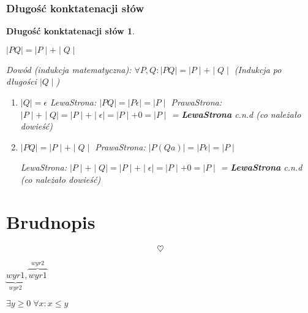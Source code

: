 \subsection{Długość konktatenacji słów}

\newtheorem*{theorem14*}{Długość konktatenacji słów}
\begin{theorem14*}
\begin{center}
$\mid PQ \mid = \mid P \mid + \mid Q \mid$
\end{center}

Dowód (indukcja matematyczna):\newline
$\forall P,Q: \mid PQ \mid = \mid P \mid + \mid Q \mid$ (Indukcja po długości $\mid Q \mid$)

\begin{enumerate}[label=(\roman*)]
\item $\mid Q \mid = \epsilon$ \newline
LewaStrona: $\mid PQ \mid = \mid P \epsilon \mid = \mid P \mid$ \newline
PrawaStrona: $\mid P \mid + \mid Q \mid = \mid P \mid + \mid \epsilon \mid = \mid P \mid+ 0 = \mid P \mid $ = { \bf LewaStrona} 
\newline c.n.d (co należało dowieść)
  
  
\item $\mid PQ \mid = \mid P \mid + \mid Q \mid $ \newline
PrawaStrona: $\mid P(Qa) \mid = \mid P \epsilon \mid = \mid P \mid$ \newline

LewaStrona: $\mid P \mid + \mid Q \mid = \mid P \mid + \mid \epsilon \mid = \mid P \mid+ 0 = \mid P \mid $ = { \bf LewaStrona} \newline c.n.d (co należało dowieść)
  
\end{enumerate} 
\end{theorem14*}







\newpage
\chapter{Brudnopis}
\label{ch:brudnopis}

$$\heartsuit$$

$\underbrace{wyr1}_{wyr2},\overbrace{wyr1}^{wyr2}$

$\exists y\geq 0\;\forall x:x\leq y$

